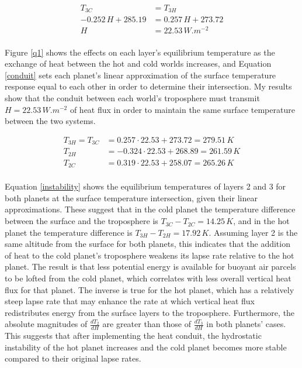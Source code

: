 \documentclass[12pt]{article}
\begin{document}
\begin{equation}\label{conduit}
    \begin{split}
        T_{3C} &= T_{3H} \\
        -0.252\,H + 285.19 &= 0.257\,H + 273.72 \\
        H &= 22.53\,\si{W.m^{-2}}\\
    \end{split}
\end{equation}

Figure \ref{q1} shows the effects on each layer's equilibrium temperature as the exchange of heat between the hot and cold worlds increases, and Equation \ref{conduit} sets each planet's linear approximation of the surface temperature response equal to each other in order to determine their intersection. My results show that the conduit between each world's troposphere must transmit $H=22.53\,\si{W.m^{-2}}$ of heat flux in order to maintain the same surface temperature between the two systems.

\begin{equation}\label{instability}
    \begin{split}
        T_{3H} = T_{3C} &= 0.257 \cdot 22.53 + 273.72 = 279.51\,\si{K} \\
        T_{2H} &= -0.324 \cdot 22.53 + 268.89 = 261.59\,\si{K} \\
        T_{2C} &= 0.319 \cdot 22.53 + 258.07 = 265.26\,\si{K} \\
    \end{split}
\end{equation}

Equation \ref{instability} shows the equilibrium temperatures of layers 2 and 3 for both planets at the surface temperature intersection, given their linear approximations. These suggest that in the cold planet the temperature difference between the surface and the troposphere is $T_{3C}-T_{2C} = 14.25\,\si{K}$, and in the hot planet the temperature difference is $T_{3H}-T_{2H} = 17.92\,\si{K}$. Assuming layer 2 is the same altitude from the surface for both planets, this indicates that the addition of heat to the cold planet's troposphere weakens its lapse rate relative to the hot planet. The result is that less potential energy is available for buoyant air parcels to be lofted from the cold planet, which correlates with less overall vertical heat flux for that planet. The inverse is true for the hot planet, which has a relatively steep lapse rate that may enhance the rate at which vertical heat flux redistributes energy from the surface layers to the troposphere. Furthermore, the absolute magnitudes of $\frac{dT_2}{dH}$ are greater than those of $\frac{dT_3}{dH}$ in both planets' cases. This suggests that after implementing the heat conduit, the hydrostatic instability of the hot planet increases and the cold planet becomes more stable compared to their original lapse rates.
\end{document}
